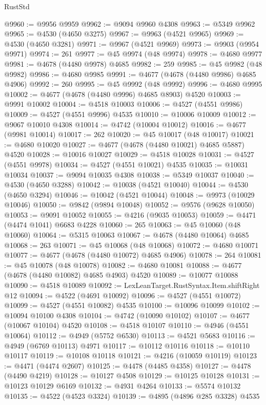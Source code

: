 \begin{lexlean}{RustStd}
\begin{coremodule}
@9960 := @9956 @9959
@9962 := @9094 @9960 @4308
@9963 := @5349 @9962
@9965 := @4530 (@4650 @3275)
@9967 := @9963 (@4521 @9965)
@9969 := @4530 (@4650 @3281)
@9971 := @9967 (@4521 @9969)
@9973 := @9903 (@9954 @9971)
@9974 := 261
@9977 := @45 @9974 (@48 @9974)
@9978 := @4680 @9977
@9981 := @4678 (@4480 @9978) @4685
@9982 := 259
@9985 := @45 @9982 (@48 @9982)
@9986 := @4680 @9985
@9991 := @4677 (@4678 (@4480 @9986) @4685 @4906)
@9992 := 260
@9995 := @45 @9992 (@48 @9992)
@9996 := @4680 @9995
@10002 := @4677 (@4678 (@4480 @9996) @4685 @8903) @4520
@10003 := @9991 @10002
@10004 := @4518 @10003
@10006 := @4527 (@4551 @9986)
@10009 := @4527 (@4551 @9996) @4535
@10010 := @10006 @10009
@10012 := @9067 @10010 @4308
@10014 := @4742 (@10004 @10012)
@10016 := @4677 (@9981 @10014)
@10017 := 262
@10020 := @45 @10017 (@48 @10017)
@10021 := @4680 @10020
@10027 := @4677 (@4678 (@4480 @10021) @4685 @5887) @4520
@10028 := @10016 @10027
@10029 := @4518 @10028
@10031 := @4527 (@4551 @9978)
@10034 := @4527 (@4551 @10021) @4535
@10035 := @10031 @10034
@10037 := @9094 @10035 @4308
@10038 := @5349 @10037
@10040 := @4530 (@4650 @3288)
@10042 := @10038 (@4521 @10040)
@10044 := @4530 (@4650 @3294)
@10046 := @10042 (@4521 @10044)
@10048 := @9973 (@10029 @10046)
@10050 := @9842 (@9894 @10048)
@10052 := @9576 (@9628 @10050)
@10053 := @9091 @10052
@10055 := @4216 (@9035 @10053)
@10059 := @4471 (@4474 @1041) @6683 @4228
@10060 := 265
@10063 := @45 @10060 (@48 @10060)
@10064 := @5315 @10063
@10067 := @4678 (@4480 @10064) @4685
@10068 := 263
@10071 := @45 @10068 (@48 @10068)
@10072 := @4680 @10071
@10077 := @4677 (@4678 (@4480 @10072) @4685 @4906)
@10078 := 264
@10081 := @45 @10078 (@48 @10078)
@10082 := @4680 @10081
@10088 := @4677 (@4678 (@4480 @10082) @4685 @4903) @4520
@10089 := @10077 @10088
@10090 := @4518 @10089
@10092 := LexLeanTarget.RustSyntax.Item.shiftRight @12
@10094 := @4522 (@4691 @10092)
@10096 := @4527 (@4551 @10072)
@10099 := @4527 (@4551 @10082) @4535
@10100 := @10096 @10099
@10102 := @10094 @10100 @4308
@10104 := @4742 (@10090 @10102)
@10107 := @4677 (@10067 @10104) @4520
@10108 := @4518 @10107
@10110 := @4946 (@4551 @10064)
@10112 := @4949 (@5752 @6530)
@10113 := @4521 @5683
@10116 := @4949 (@6769 @10113) @4971
@10117 := @10112 @10116
@10118 := @10110 @10117
@10119 := @10108 @10118
@10121 := @4216 (@10059 @10119)
@10123 := @4471 (@4474 @2607)
@10125 := @4478 (@4485 @4358)
@10127 := @4478 (@4490 @4219)
@10128 := @10127 @4508
@10129 := @10125 @10128
@10131 := @10123 @10129 @6169
@10132 := @4931 @4264
@10133 := @5574 @10132
@10135 := @4522 (@4523 @3324)
@10139 := @4895 (@4896 @285 @3328) @4535

\end{coremodule}
\end{lexlean}
